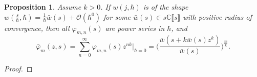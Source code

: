 \documentclass[10pt,a4paper,oneside,no-math,reqno]{amsart}%
\theoremstyle{plain}
\newtheorem{proposition}[theorem]{Proposition}
\theoremstyle{definition}
\theoremstyle{remark}
\numberwithin{equation}{section}
\renewcommand{\phi}{\varphi}
\newcommand{\mb}[1]{\mathbb{#1}}
\newcommand{\mc}[1]{\mathcal{#1}}
\newcommand{\1}{\mathds{1}}
\newcommand{\C}{\mb{C}}
\newcommand{\<}{\langle}
\renewcommand{\>}{\rangle}
\begin{document}
\begin{proposition}\label{ChangeOfCoords}
	Assume $k>0$. If $ w(j, \hbar )$ is of the shape $ w(\frac{s}{\hbar}, \hbar) = \frac{1}{\hbar} \bar{w}(s)+ \mc{O} (\hbar^0)$ for some $ \bar{w} (s) \in s \C\llbracket s \rrbracket$ with positive radius of convergence, then all $ \phi_{m,n}(s)$ are power series in $ \hbar$, and
	\begin{equation}
		\bar{\phi}_m ( z, s) 
        =
        \sum_{n=0}^\infty \phi_{m,n} (s) z^{nk} \Big|_{\hbar = 0}
        =
        \Big( \frac{\bar{w}(s + k \bar{w}(s)z^k)}{\bar{w}(s)}\Big)^{\frac{m}{k}} .
	\end{equation}
\end{proposition}

\begin{proof}

\end{proof}
\end{document}
